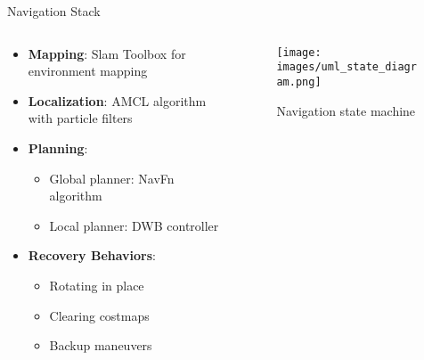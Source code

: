 \documentclass[aspectratio=169]{beamer}
\begin{document}
\begin{frame}{Navigation Stack}
  \begin{columns}
    \begin{column}{0.6\textwidth}
      \begin{itemize}
      \item \textbf{Mapping}: Slam Toolbox for environment mapping
      \item \textbf{Localization}: AMCL algorithm with particle filters
      \item \textbf{Planning}:
        \begin{itemize}
        \item Global planner: NavFn algorithm
        \item Local planner: DWB controller
        \end{itemize}
      \item \textbf{Recovery Behaviors}:
        \begin{itemize}
        \item Rotating in place
        \item Clearing costmaps
        \item Backup maneuvers
        \end{itemize}
      \end{itemize}
    \end{column}
    \begin{column}{0.4\textwidth}
      \begin{figure}
        \texttt{[image: images/uml\_state\_diagram.png]}
        \caption{Navigation state machine}
      \end{figure}
    \end{column}
  \end{columns}
\end{frame}
\end{document}
